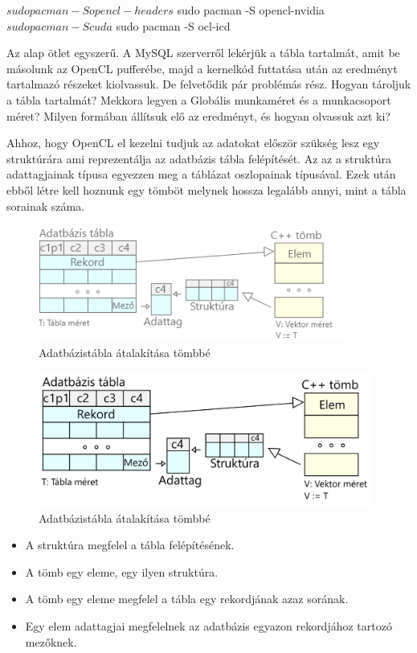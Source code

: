 \begin{python}
$ sudo pacman -S opencl-headers
$ sudo pacman -S opencl-nvidia
$ sudo pacman -S cuda
$ sudo pacman -S ocl-icd
\end{python}


Az alap ötlet egyszerű. A MySQL szerverről lekérjük a tábla tartalmát, amit be másolunk az OpenCL pufferébe, majd a kernelkód futtatása után az eredményt tartalmazó részeket kiolvassuk. De felvetődik pár problémás rész. Hogyan tároljuk a tábla tartalmát? Mekkora legyen a Globális munkaméret és a munkacsoport méret? Milyen formában állítsuk elő az eredményt, és hogyan olvassuk azt ki?

Ahhoz, hogy OpenCL el kezelni tudjuk az adatokat először szükség lesz egy struktúrára ami reprezentálja az adatbázis tábla felépítését. Az az a struktúra adattagjainak típusa egyezzen meg a táblázat oszlopainak típusával. Ezek után ebből létre kell hoznunk egy tömböt melynek hossza legalább annyi, mint a tábla sorainak száma.

\begin{figure}[h!]
\centering
\includegraphics[width=10cm]{images/table-struct.png}
\caption{Adatbázistábla átalakítása tömbbé}
\label{fig:opencl}
\end{figure}
\begin{figure}[h!]
\centering
\includegraphics[width=11cm]{images/data/structure.png}
\caption{Adatbázistábla átalakítása tömbbé}
\label{fig:opencl}
\end{figure}

\begin{itemize}
\item A struktúra megfelel a tábla felépítésének.
\item A tömb egy eleme, egy ilyen struktúra.
\item A tömb egy eleme megfelel a tábla egy rekordjának azaz sorának.
\item Egy elem adattagjai megfelelnek az adatbázis egyazon rekordjához tartozó mezőknek.
\end{itemize}

